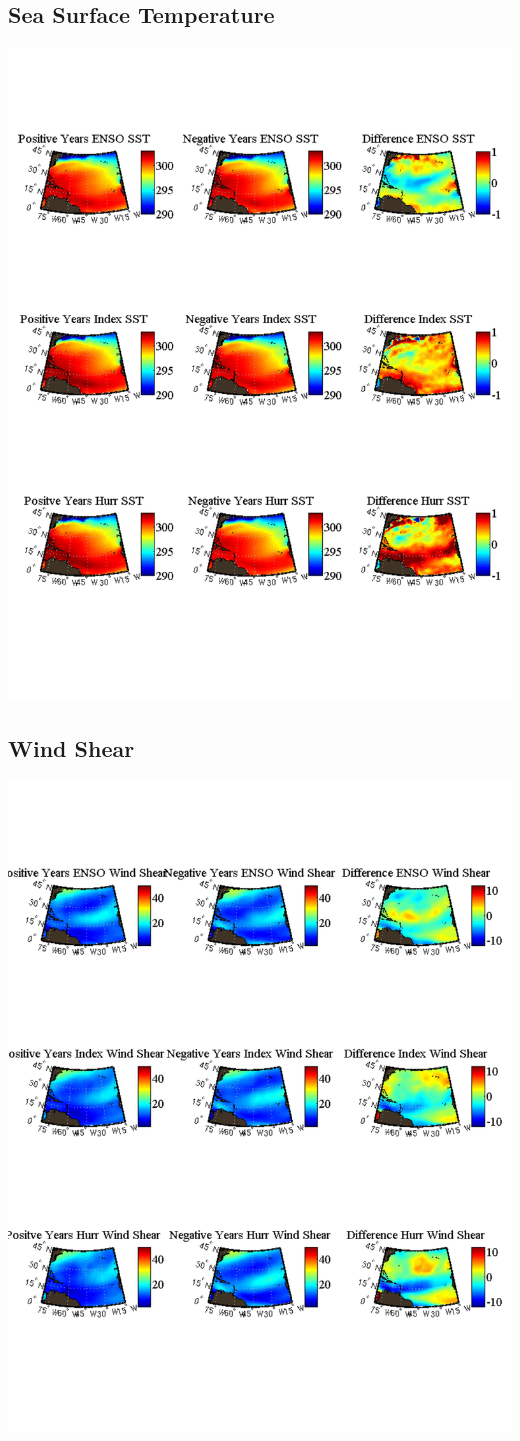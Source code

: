 \documentclass[11pt]{article}
\begin{document}
\subsection{Sea Surface Temperature}
\includegraphics[scale=.75]{images/compareSSTComposites.pdf}
\newpage

\subsection{Wind Shear}
\includegraphics[scale=.75]{images/compareWindShearComposites.pdf}
\end{document}
